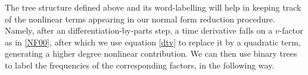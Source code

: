 \documentclass[%
11pt,  reqno]{amsart}
\newcommand{\5}{\textup{V}}
\newcommand{\noi}{\noindent}
\theoremstyle{remark}
\newcommand{\TT}{\mathcal{T}}
\numberwithin{equation}{section}
\numberwithin{theorem}{section}
\begin{document}






The tree structure defined above and its word-labelling will help in keeping track of the nonlinear terms appearing in our normal form reduction procedure. Namely, after an differentiation-by-parts step, a time derivative falls on a $v$-factor as in \eqref{NF00}, after which we use equation \eqref{dtv} to replace it by a quadratic term, generating a higher degree nonlinear contribution. We can then use binary trees to label the frequencies of the corresponding factors, in the following way. 
\end{document}
